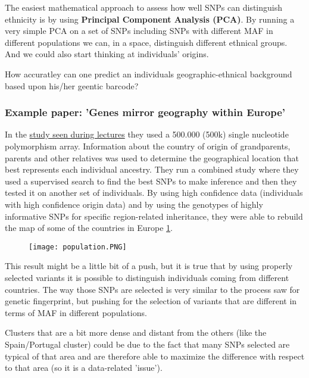 The easiest mathematical approach to assess how well SNPs can distinguish ethnicity is by using \textbf{Principal Component Analysis (PCA)}. By running a very simple PCA on a set of SNPs including SNPs with different MAF in different populations we can, in a space, distinguish different ethnical groups. And we could also start thinking at individuals' origins.

How accuratley can one predict an individuals geographic-ethnical background based upon his/her geentic barcode?

\subsubsection{Example paper: 'Genes mirror geography within Europe'}

In the \href{https://www.ncbi.nlm.nih.gov/pmc/articles/PMC2735096/}{study seen during lectures} they used a 500.000 (500k) single nucleotide polymorphism array. Information about the country of origin of grandparents, parents and other relatives was used to determine the geographical location that best represents each individual ancestry.
They run a combined study where they used a supervised search to find the best SNPs to make inference and then they tested it on another set of individuals.
By using high confidence data (individuals with high confidence origin data) and by using the genotypes of highly informative SNPs for specific region-related inheritance, they were able to rebuild the map of some of the countries in Europe \ref*{fig:PCA_countries}.

\begin{figure}[H]
	\texttt{[image: population.PNG]}
	\caption{\label{fig:PCA_countries}}
\end{figure}

This result might be a little bit of a push, but it is true that by using properly selected variants it is possible to distinguish individuals coming from different countries. The way those SNPs are selected is very similar to the process saw for genetic fingerprint, but pushing for the selection of variants that are different in terms of MAF in different populations.

Clusters that are a bit more dense and distant from the others (like the Spain/Portugal cluster) could be due to the fact that many SNPs selected are typical of that area and are therefore able to maximize the difference with respect to that area (so it is a data-related 'issue').

